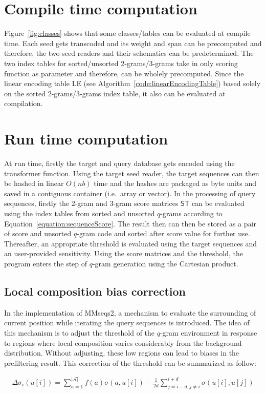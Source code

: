 \documentclass[twoside,a4paper,bsc]{master}
\newcommand{\Qgram}[1]{\(#1\)-gram}
\newcommand{\Scoretablename}[0]{\mathsf{ST}}
\newcommand{\Alpha}[0]{\mathcal{A}}
\begin{document}
\section{Compile time computation}
Figure~\ref{fig:classes} shows that some classes/tables can be evaluated at
compile time. Each seed gets transcoded and its weight and span can be
precomputed and therefore, the two seed readers and their schematics can be
predetermined. The two index tables for sorted/unsorted 2-grams/3-grams
take in only scoring function as parameter and therefore, can be wholely
precomputed. Since the linear encoding table LE (see
Algorithm~\ref{code:linearEncodingTable}) based solely on the sorted
2-grams/3-grams index table, it also can be evaluated at compilation.
\section{Run time computation}
At run time, firstly the target and query database gets encoded using the
transformer function. Using the target seed reader, the target sequences
can then be hashed in linear \(O(nb)\) time and the hashes are packaged as
byte units and saved in a contiguous container (i.e.\ array or vector).
In the processing of query sequences, firstly the \Qgram{2} and \Qgram{3}
score matrices \(\Scoretablename\) can be evaluated using the index tables
from sorted and unsorted \Qgram{q}s according to
Equation~\ref{equation:sequenceScore}. The result then can then be stored
as a pair of score and unsorted \Qgram{q} code and sorted after score
value for further use. Thereafter, an appropriate threshold is evaluated
using the target sequences and an user-provided sensitivity. Using the
score matrices and the threshold, the program enters the step of \Qgram{q}
generation using the Cartesian product.
\subsection{Local composition bias correction}
In the implementation of MMseqs2, a mechanism to evaluate the surrounding
of current position while iterating the query sequences is introduced. The
idea of this mechanism is to adjust the threshold of the \Qgram{q}
environment in response to regions where local composition varies
considerably from the background distribution. Without adjusting, these low
regions can lead to biases in the prefiltering result. This correction of
the threshold can be summarized as follow:

\begin{align}
\Delta \sigma_i(u[i]) =
\sum_{a=1}^{|\Alpha|}f(a)\sigma(a,u[i])-\frac{1}{2d}\sum_{j=i-d,j\neq
i}^{i+d}\sigma (u[i],u[j])
\end{align}
\end{document}
